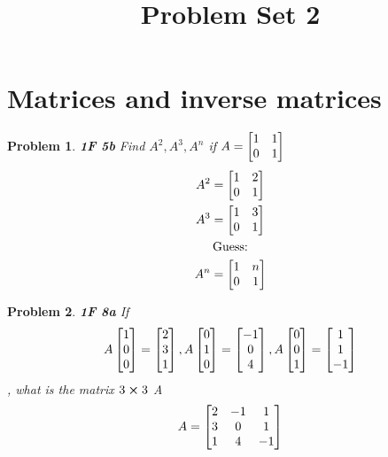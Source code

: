 \documentclass[11pt]{article}
\begin{document}
    \title{Problem Set 2}
    \maketitle

    \newtheorem{theorem}{Theorem}
    \newtheorem{definition}{Definition}
    \newtheorem{example}{Example}
    \newtheorem{problem}{Problem}

    \section{Matrices and inverse matrices}
    \begin{problem}
        \textbf{1F 5b}
        Find $A^2 ,A^3 , A^n $ if $A=\bmqty{1 & 1 \\ 0 & 1}$
        \begin{gather*}
            A^2 = \bmqty{1 & 2 \\ 0 & 1}\\
            A^3 = \bmqty{1 & 3 \\ 0 & 1}\\
            \text{Guess:}\\
            A^n = \bmqty{1 & n \\ 0 & 1}\\
        \end{gather*}
    \end{problem}
    \begin{problem}
        \textbf{1F 8a}
        If \[
               A \bmqty{1 \\ 0 \\ 0} = \bmqty{2 \\ 3 \\ 1 },
               A \bmqty{0 \\1 \\ 0 } = \bmqty{-1 \\ 0 \\ 4 },
               A \bmqty{0 \\ 0 \\ 1} = \bmqty{1 \\ 1 \\ -1}
        \], what is the matrix $3 \cross 3 $ A\\
        \begin{gather*}
            A = \bmqty{
            2 & -1 & 1 \\
            3 & 0 & 1 \\
            1 & 4 & -1
            }
        \end{gather*}
    \end{problem}
\end{document}
